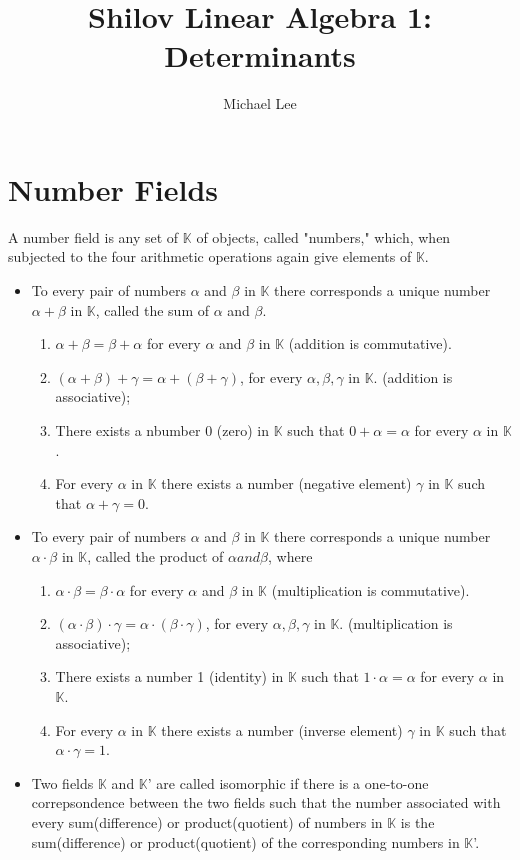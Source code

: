 \documentclass[11pt]{article} %
\title{Shilov Linear Algebra 1: Determinants}
\author{Michael Lee}
\newenvironment{definition}[1][Definition]{\begin{trivlist}
\item[\hskip \labelsep {\bfseries #1}]}{\end{trivlist}}
\begin{document}
\maketitle
\section{Number Fields}
\begin{definition} 
	A number field is any set of $\mathbb{K}$ of objects, called "numbers," which, when subjected to the four arithmetic operations again give elements of $\mathbb{K}$.
\begin{itemize}
\item To every pair of numbers $\alpha$ and $\beta$ in $\mathbb{K}$ there corresponds a unique 		number $\alpha + \beta $ in $\mathbb{K}$, called the sum of $\alpha$ and $\beta$. 	 
	\begin{enumerate}
		\item $\alpha + \beta = \beta + \alpha$ for every $\alpha$ and $\beta$ in $\mathbb{K}$ (addition is commutative). 
		\item $(\alpha + \beta) + \gamma = \alpha + (\beta + \gamma)$, for every $\alpha, \beta, \gamma$ in $\mathbb{K}$. (addition is associative);
		\item There exists a nbumber 0 (zero) in $\mathbb{K}$ such that $0 + \alpha = \alpha$ for every $\alpha$ in $\mathbb{K}$. 
		\item For every $\alpha$ in $\mathbb{K}$ there exists a number (negative element) $\gamma$ in $\mathbb{K}$ such that $\alpha + \gamma = 0$.
	\end{enumerate}
\item To every pair of numbers $\alpha$ and $\beta$ in $\mathbb{K}$ there corresponds a unique number $\alpha \cdot \beta$ in $\mathbb{K}$, called the product of $\alpha and \beta$, where
	\begin{enumerate}
		\item $\alpha\cdot\beta = \beta\cdot\alpha$ for every $\alpha$ and $\beta$ in $\mathbb{K}$ (multiplication is commutative).
		\item $(\alpha \cdot \beta) \cdot \gamma = \alpha \cdot (\beta \cdot \gamma)$, for every $\alpha, \beta, \gamma$ in $\mathbb{K}$. (multiplication is associative);
		\item There exists a number 1 (identity) in $\mathbb{K}$ such that $1 \cdot \alpha = \alpha$ for every $\alpha$ in $\mathbb{K}$.
 		\item For every $\alpha$ in $\mathbb{K}$ there exists a number (inverse element) $\gamma$ in $\mathbb{K}$ such that $\alpha \cdot \gamma = 1$.
	\end{enumerate}
\item Two fields $\mathbb{K}$ and $\mathbb{K}$' are called isomorphic if there is a one-to-one correpsondence between the two fields such that the number associated with every sum(difference) or product(quotient) of numbers in $\mathbb{K}$ is the sum(difference) or product(quotient) of the corresponding numbers in $\mathbb{K}$'.
\end{itemize}
\end{definition}
\end{document}

